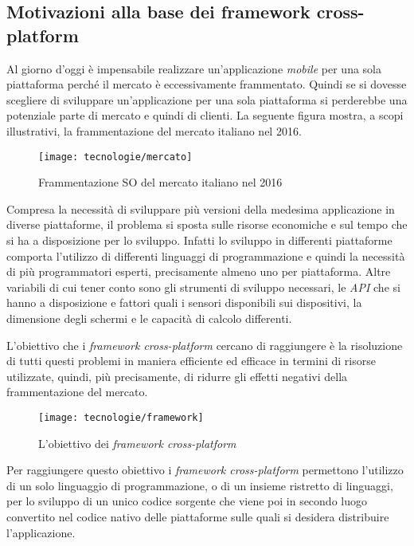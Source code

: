 \subsection{Motivazioni alla base dei framework cross-platform}

Al giorno d'oggi è impensabile realizzare un'applicazione \textit{mobile} per una sola piattaforma perché il mercato è eccessivamente frammentato. Quindi se si dovesse scegliere di sviluppare un'applicazione per una sola piattaforma si perderebbe una potenziale parte di mercato e quindi di clienti. La seguente figura mostra, a scopi illustrativi, la frammentazione del mercato italiano nel 2016.

\begin{figure}[!h] 
    \centering 
    \texttt{[image: tecnologie/mercato]} 
    \caption{Frammentazione SO del mercato italiano nel 2016}
\end{figure}

Compresa la necessità di sviluppare più versioni della medesima applicazione in diverse piattaforme, il problema si sposta sulle risorse economiche e sul tempo che si ha a disposizione per lo sviluppo. Infatti lo sviluppo in differenti piattaforme comporta l'utilizzo di differenti linguaggi di programmazione e quindi la necessità di più programmatori esperti, precisamente almeno uno per piattaforma. Altre variabili di cui tener conto sono gli strumenti di sviluppo necessari, le \textit{API} che si hanno a disposizione e fattori quali i sensori disponibili sui dispositivi, la dimensione degli schermi e le capacità di calcolo differenti.

L'obiettivo che i \textit{framework cross-platform} cercano di raggiungere è la risoluzione di tutti questi problemi in maniera efficiente ed efficace in termini di risorse utilizzate, quindi, più precisamente, di ridurre gli effetti negativi della frammentazione del mercato.

\begin{figure}[!h] 
    \centering 
    \texttt{[image: tecnologie/framework]} 
    \caption{L'obiettivo dei \textit{framework cross-platform}}
\end{figure}

Per raggiungere questo obiettivo i \textit{framework cross-platform} permettono l'utilizzo di un solo linguaggio di programmazione, o di un insieme ristretto di linguaggi, per lo sviluppo di un unico codice sorgente che viene poi in secondo luogo convertito nel codice nativo delle piattaforme sulle quali si desidera distribuire l'applicazione. 

